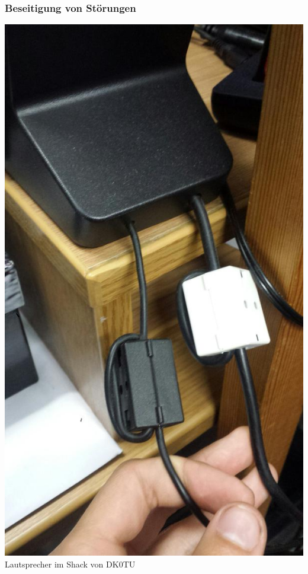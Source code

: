 \begin{frame}
  \frametitle{Beseitigung von Störungen}
  \begin{center}
    \includegraphics[width=\textwidth,height=0.80\textheight,keepaspectratio]{a19/2Filter.jpg}\\
    {\tiny Lautsprecher im Shack von DK0TU}
  \end{center}
\end{frame}

